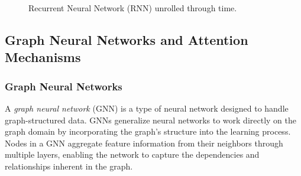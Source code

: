 \documentclass{article}
\begin{document}
\begin{figure}[H]
    \centering
    \caption{Recurrent Neural Network (RNN) unrolled through time.}
    \label{fig:rnn}
\end{figure}



\subsection{Graph Neural Networks and Attention Mechanisms}

\subsubsection{Graph Neural Networks}

A \emph{graph neural network} (GNN) is a type of neural network designed to handle graph-structured data. GNNs generalize neural networks to work directly on the graph domain by incorporating the graph's structure into the learning process. Nodes in a GNN aggregate feature information from their neighbors through multiple layers, enabling the network to capture the dependencies and relationships inherent in the graph.
\end{document}
